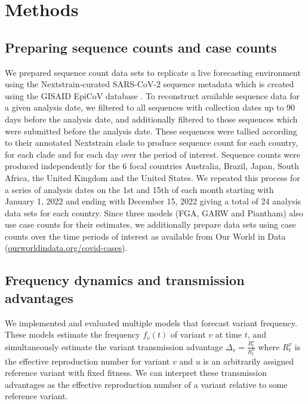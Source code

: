 \documentclass[11pt,oneside,letterpaper]{article}
\begin{document}
\section*{Methods}

\subsection*{Preparing sequence counts and case counts}

We prepared sequence count data sets to replicate a live forecasting environment using the Nextstrain-curated SARS-CoV-2 sequence metadata \cite{hadfield2018nextstrain} which is created using the GISAID EpiCoV database \cite{khare2021gisaid}.
To reconstruct available sequence data for a given analysis date, we filtered to all sequences with collection dates up to 90 days before the analysis date, and additionally filtered to those sequences which were submitted before the analysis date.
These sequences were tallied according to their annotated Nextstrain clade to produce sequence count for each country, for each clade and for each day over the period of interest.
Sequence counts were produced independently for the 6 focal countries Australia, Brazil, Japan, South Africa, the United Kingdom and the United States.
We repeated this process for a series of analysis dates on the 1st and 15th of each month starting with January 1, 2022 and ending with December 15, 2022 giving a total of 24 analysis data sets for each country.
Since three models (FGA, GARW and Piantham) also use case counts for their estimates, we additionally prepare data sets using case counts over the time periods of interest as available from Our World in Data (\href{https://ourworldindata.org/covid-cases}{ourworldindata.org/covid-cases}).

\subsection*{Frequency dynamics and transmission advantages}

We implemented and evaluated multiple models that forecast variant frequency.
These models estimate the frequency $f_{v}(t)$ of variant $v$ at time $t$, and simultaneously estimate the variant transmission advantage $\Delta_{v} = \frac{R_{t}^{v}}{R_{t}^{u}}$ where $R_{t}^{v}$ is the effective reproduction number for variant $v$ and $u$ is an arbitrarily assigned reference variant with fixed fitness.
We can interpret these transmission advantages as the effective reproduction number of a variant relative to some reference variant.
\end{document}
